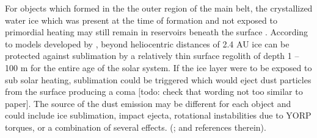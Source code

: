 \documentclass[iop,apj]{emulateapj}
\begin{document}

For objects which formed in the the outer region of the main belt, the crystallized water ice which was present at the time of formation and not exposed to primordial heating may still remain in reservoirs beneath the surface \citep{prailnik09}.  According to models developed by \citet*{fanale89},  beyond heliocentric distances of 2.4 AU ice can be protected against sublimation by a relatively thin surface regolith  of depth 1 -- 100 m for the entire age of the solar system. If the ice layer were to be exposed to sub solar heating,  sublimation could be triggered which would  eject dust particles from the surface producing a coma [todo: check that wording not too similar to paper]. The source of the dust emission may be different for each object and could include ice sublimation, impact ejecta, rotational instabilities due to YORP torques, or a combination of several effects. (\cite{hsieh15}; and references therein).  

\end{document}
